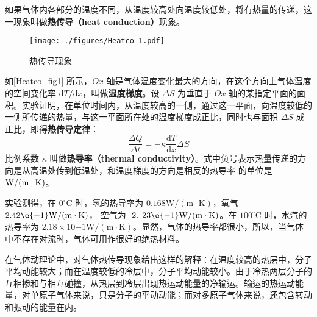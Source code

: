 
如果气体内各部分的温度不同，从温度较高处向温度较低处，将有热量的传递，这一现象叫做\textbf{热传导（heat conduction）}现象。

\begin{figure}[ht]
\centering
\texttt{[image: ./figures/Heatco\_1.pdf]}
\caption{热传导现象} \label{Heatco_fig1}
\end{figure}

如\autoref{Heatco_fig1} 所示，$Ox$ 轴是气体温度变化最大的方向，在这个方向上气体温度的空间变化率 $\mathrm dT/\mathrm dx$，叫做\textbf{温度梯度}。设 $\Delta S$ 为垂直于 $Ox $ 轴的某指定平面的面积。实验证明，在单位时间内，从温度较高的一侧，通过这一平面，向温度较低的一侧所传递的热量，与这一平面所在处的温度梯度成正比，同时也与面积 $\Delta S$ 成正比，即得\textbf{热传导定律}：
\begin{equation}
\frac{\Delta Q}{\Delta t}=-\kappa \frac{\mathrm{d} T}{\mathrm{d} x} \Delta S
\end{equation}
比例系数 $\kappa$ 叫做\textbf{热导率（thermal conductivity）}。式中负号表示热量传递的方向是从高温处传到低温处，和温度梯度的方向是相反的热导率
的单位是 $\rm W /(m \cdot K)$。

实验测得，在 $0^{\circ} \mathrm{C}$ 时，氢的热导率为 $0.168 \mathrm{W} /(\mathrm{m} \cdot \mathrm{K})$，氧气 $2.42\e{-1} \mathrm{W} /(\mathrm{m} \cdot \mathrm{K})$， 空气为 $\text { 2. } 23\e{-1} \mathrm{W} /(\mathrm{m} \cdot \mathrm{K})$。在 $100^{\circ} \mathrm{C}$ 时，水汽的热导率为 $2. 18\times  10{-1}\mathrm{W} /(\mathrm{m} \cdot \mathrm{K})$。显然，气体的热导率都很小，所以，当气体中不存在对流时，气体可用作很好的绝热材料。

在气体动理论中，对气体热传导现象给出这样的解释：在温度较高的热层中，分子平均动能较大；而在温度较低的冷层中，分子平均动能较小。由于冷热两层分子的互相掺和与相互碰撞，从热层到冷层出现热运动能量的净输运。输运的热运动能量，对单原子气体来说，只是分子的平动动能；而对多原子气体来说，还包含转动和振动的能量在内。